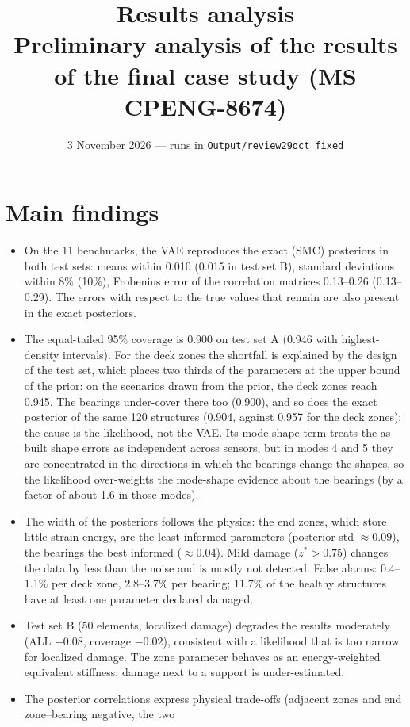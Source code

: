 \documentclass[11pt]{article}
\title{\sffamily\bfseries Results analysis\\[4pt]
\large Preliminary analysis of the results of the final case study (MS CPENG-8674)}
\author{}
\date{3 November 2026 --- runs in \texttt{Output/review29oct\_fixed}}
\begin{document}
\maketitle

\section*{Main findings}
\begin{itemize}
\item On the 11 benchmarks, the VAE reproduces the exact (SMC) posteriors in both test sets: means within 0.010
(0.015 in test set B), standard deviations within 8\% (10\%), Frobenius error of the correlation matrices 0.13--0.26
(0.13--0.29). The errors with respect to the true values that remain are also present in the exact posteriors.
\item The equal-tailed 95\% coverage is 0.900 on test set A (0.946 with highest-density intervals). For the deck zones
the shortfall is explained by the design of the test set, which places two thirds of the parameters at the upper bound
of the prior: on the scenarios drawn from the prior, the deck zones reach 0.945. The bearings under-cover there too
(0.900), and so does the exact posterior of the same 120 structures (0.904, against 0.957 for the deck zones): the
cause is the likelihood, not the VAE. Its mode-shape term treats the as-built shape errors as independent across
sensors, but in modes 4 and 5 they are concentrated in the directions in which the bearings change the shapes, so the
likelihood over-weights the mode-shape evidence about the bearings (by a factor of about 1.6 in those modes).
\item The width of the posteriors follows the physics: the end zones, which store little strain energy, are the least
informed parameters (posterior std $\approx0.09$), the bearings the best informed ($\approx0.04$). Mild damage
($z^*>0.75$) changes the data by less than the noise and is mostly not detected. False alarms: 0.4--1.1\% per deck
zone, 2.8--3.7\% per bearing; 11.7\% of the healthy structures have at least one parameter declared damaged.
\item Test set B (50 elements, localized damage) degrades the results moderately (ALL $-0.08$, coverage $-0.02$),
consistent with a likelihood that is too narrow for localized damage. The zone parameter behaves as an
energy-weighted equivalent stiffness: damage next to a support is under-estimated.
\item The posterior correlations express physical trade-offs (adjacent zones and end zone--bearing negative, the two

\end{itemize}
\end{document}
